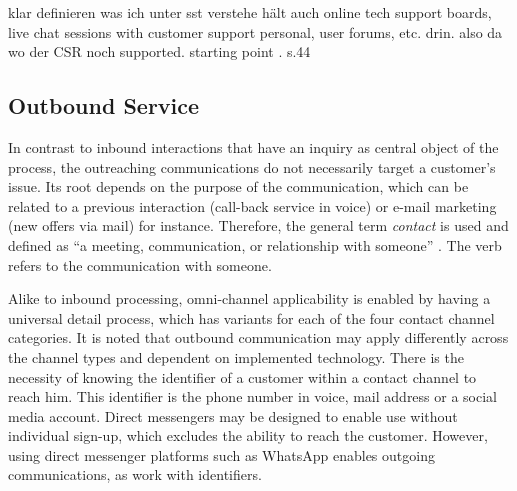 	 
	 
	 
	 klar definieren was ich unter sst verstehe \citep{Thomas:2009} hält auch online tech support boards, live chat sessions with customer support personal, user forums, etc. drin. also da wo der CSR noch supported. 
	 starting point \citep{Thomas:2009}.
	 \citep{ccn2016} s.44
	 
	 
	 
	 \newpage
	 \newpage
	 
	 \subsection{Outbound Service}
	 
	 In contrast to inbound interactions that have an inquiry as central object of the process, the outreaching communications do not necessarily target a customer's issue. Its root depends on the purpose of the communication, which can be related to a previous interaction (call-back service in voice) or e-mail marketing (new offers via mail) for instance. Therefore, the general term \textit{contact} is used and defined as \enquote{a meeting, communication, or relationship with someone} \citep{oxfordcontact}. The verb refers to the communication with someone.
	 
	 Alike to inbound processing, omni-channel applicability is enabled by having a universal detail process, which has variants for each of the four contact channel categories. It is noted that outbound communication may apply differently across the channel types and dependent on implemented technology. There is the necessity of knowing the identifier of a customer within a contact channel to reach him. This identifier is the phone number in voice, mail address or a social media account. Direct messengers may be designed to enable use without individual sign-up, which excludes the ability to reach the customer. However, using direct messenger platforms such as WhatsApp enables outgoing communications, as work with identifiers. 
	 
